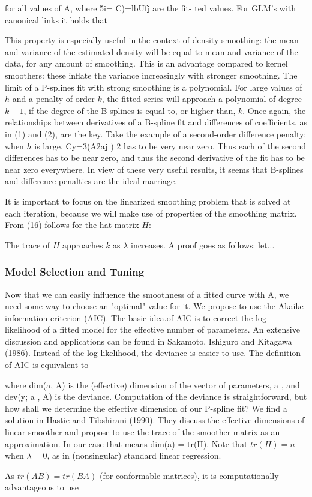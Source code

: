 \documentclass[12pt]{article}
\newcommand*\needsparaphrased{\color{red}}
\newcommand*\outlineskeleton{\color{green}}
\begin{document}
{\needsparaphrased  for all values of A, where 5i= C)=lbUfj are the fit- ted values. For GLM's with canonical links it holds that }

{\needsparaphrased This property is especially useful in the context of density smoothing: the mean and variance of the estimated density will be equal to mean and variance of the data, for any amount of smoothing. This is an advantage compared to kernel smoothers: these inflate the variance increasingly with stronger smoothing. The limit of a P-splines fit with strong smoothing is a polynomial. For large values of $h$ and a penalty of order $k$, the fitted series will approach a polynomial of degree $k-1$, if the degree of the B-splines is equal to, or higher than, $k$. Once again, the relationships between derivatives of a B-spline fit and differences of coefficients, as in (1) and (2), are the key. Take the example of a second-order difference penalty: when $h$ is large, Cy=3(A2aj ) 2 has to be very near zero. Thus each of the second differences has to be near zero, and thus the second derivative of the fit has to be near zero everywhere. In view of these very useful results, it seems that B-splines and difference penalties are the ideal marriage.

It is important to focus on the linearized smoothing problem that is solved at each iteration, because we will make use of properties of the smoothing matrix. From (16) follows for the hat matrix $H$:}

{\needsparaphrased The trace of $H$ approaches $k$ as $\lambda$ increases. A proof goes as follows: let...}

\subsubsection{{\outlineskeleton Model Selection and Tuning}}
{\needsparaphrased  Now that we can easily influence the smoothness of a fitted curve with A, we need some way to choose an "optimal" value for it. We propose to use the Akaike information criterion (AIC). The basic idea.of AIC is to correct the log- likelihood of a fitted model for the effective number of parameters. An extensive discussion and applications can be found in Sakamoto, Ishiguro and Kitagawa (1986). Instead of the log-likelihood, the deviance is easier to use. The definition of AIC is equivalent to}

{\needsparaphrased where dim(a, A) is the (effective) dimension of the vector of parameters, a , and dev(y; a , A) is the deviance.
Computation of the deviance is straightforward, but how shall we determine the effective dimension of our P-spline fit? We find a solution in Hastie and Tibshirani (1990). They discuss the effective dimensions of linear smoother and propose to use the trace of the smoother matrix as an approximation. In our case that means dim(a) = tr(H). Note that $tr\left(H\right) = n$ when $\lambda = 0$, as in (nonsingular) standard linear regression. 

As $tr\left(AB\right) = tr\left(BA\right)$ (for conformable matrices), it is computationally advantageous to use}
\end{document}

